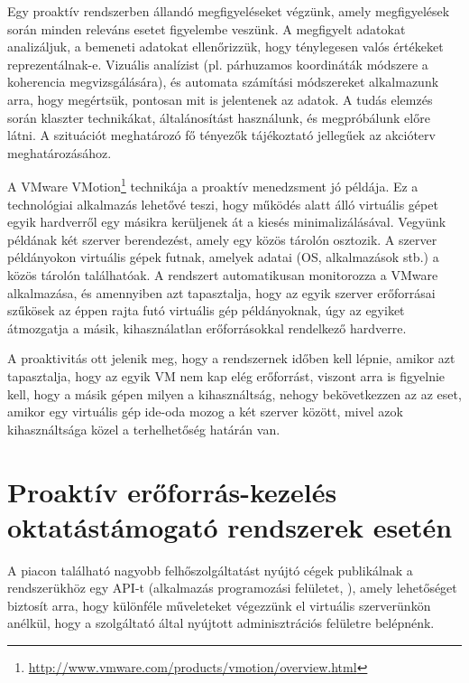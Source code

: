 Egy proaktív rendszerben állandó megfigyeléseket végzünk, amely megfigyelések során minden releváns esetet figyelembe veszünk. A megfigyelt adatokat analizáljuk, a bemeneti adatokat ellenőrizzük, hogy ténylegesen valós értékeket reprezentálnak-e. Vizuális analízist (pl. párhuzamos koordináták módszere a koherencia megvizsgálására), és automata számítási módszereket alkalmazunk arra, hogy megértsük, pontosan mit is jelentenek az adatok. A tudás elemzés során klaszter technikákat, általánosítást használunk, és megpróbálunk előre látni. A szituációt meghatározó fő tényezők tájékoztató jellegűek az akcióterv meghatározásához.

A VMware VMotion\footnote{\href{http://www.vmware.com/products/vmotion/overview.html}{http://www.vmware.com/products/vmotion/overview.html}} technikája a proaktív menedzsment jó példája. Ez a technológiai alkalmazás lehetővé teszi, hogy működés alatt álló virtuális gépet egyik hardverről egy másikra kerüljenek át a kiesés minimalizálásával. Vegyünk példának két szerver berendezést, amely egy közös tárolón osztozik. A szerver példányokon virtuális gépek futnak, amelyek adatai (OS, alkalmazások stb.) a közös tárolón találhatóak. A rendszert automatikusan monitorozza a VMware alkalmazása, és amennyiben azt tapasztalja, hogy az egyik szerver erőforrásai szűkösek az éppen rajta futó virtuális gép példányoknak, úgy az egyiket átmozgatja a másik, kihasználatlan erőforrásokkal rendelkező hardverre.

A proaktivitás ott jelenik meg, hogy a rendszernek időben kell lépnie, amikor azt tapasztalja, hogy az egyik VM nem kap elég erőforrást, viszont arra is figyelnie kell, hogy a másik gépen milyen a kihasználtság, nehogy bekövetkezzen az az eset, amikor egy virtuális gép ide-oda mozog a két szerver között, mivel azok kihasználtsága közel a terhelhetőség határán van.

\section{Proaktív erőforrás-kezelés oktatástámogató rendszerek esetén}


A piacon található nagyobb felhőszolgáltatást nyújtó cégek publikálnak a rendszerükhöz egy API-t (alkalmazás programozási felületet, ), amely lehetőséget biztosít arra, hogy különféle műveleteket végezzünk el virtuális szerverünkön anélkül, hogy a szolgáltató által nyújtott adminisztrációs felületre belépnénk.

